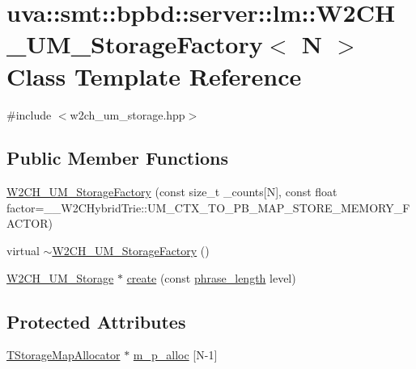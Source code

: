 \hypertarget{classuva_1_1smt_1_1bpbd_1_1server_1_1lm_1_1_w2_c_h___u_m___storage_factory}{}\section{uva\+:\+:smt\+:\+:bpbd\+:\+:server\+:\+:lm\+:\+:W2\+C\+H\+\_\+\+U\+M\+\_\+\+Storage\+Factory$<$ N $>$ Class Template Reference}
\label{classuva_1_1smt_1_1bpbd_1_1server_1_1lm_1_1_w2_c_h___u_m___storage_factory}


{\ttfamily \#include $<$w2ch\+\_\+um\+\_\+storage.\+hpp$>$}

\subsection*{Public Member Functions}
\begin{DoxyCompactItemize}
\item 
\hyperlink{classuva_1_1smt_1_1bpbd_1_1server_1_1lm_1_1_w2_c_h___u_m___storage_factory_aa6ecf82dcaf503dd92af8763cb90b093}{W2\+C\+H\+\_\+\+U\+M\+\_\+\+Storage\+Factory} (const size\+\_\+t \+\_\+counts\mbox{[}N\mbox{]}, const float factor=\+\_\+\+\_\+\+W2\+C\+Hybrid\+Trie\+::\+U\+M\+\_\+\+C\+T\+X\+\_\+\+T\+O\+\_\+\+P\+B\+\_\+\+M\+A\+P\+\_\+\+S\+T\+O\+R\+E\+\_\+\+M\+E\+M\+O\+R\+Y\+\_\+\+F\+A\+C\+T\+O\+R)
\item 
virtual \hyperlink{classuva_1_1smt_1_1bpbd_1_1server_1_1lm_1_1_w2_c_h___u_m___storage_factory_ad3fa9bea0072bda045c90512c5ae8d7a}{$\sim$\+W2\+C\+H\+\_\+\+U\+M\+\_\+\+Storage\+Factory} ()
\item 
\hyperlink{classuva_1_1smt_1_1bpbd_1_1server_1_1lm_1_1_w2_c_h___u_m___storage}{W2\+C\+H\+\_\+\+U\+M\+\_\+\+Storage} $\ast$ \hyperlink{classuva_1_1smt_1_1bpbd_1_1server_1_1lm_1_1_w2_c_h___u_m___storage_factory_ab360ad98835a2d1f4ec6fb91ad35bb83}{create} (const \hyperlink{namespaceuva_1_1smt_1_1bpbd_1_1server_af068a19c2e03116caf3e3827a3e40e35}{phrase\+\_\+length} level)
\end{DoxyCompactItemize}
\subsection*{Protected Attributes}
\begin{DoxyCompactItemize}
\item 
\hyperlink{namespaceuva_1_1smt_1_1bpbd_1_1server_1_1lm_a70b67dc80579cc0df5e9509d40b2563a}{T\+Storage\+Map\+Allocator} $\ast$ \hyperlink{classuva_1_1smt_1_1bpbd_1_1server_1_1lm_1_1_w2_c_h___u_m___storage_factory_a2191bc31eb8246da200e8c39a353c0f8}{m\+\_\+p\+\_\+alloc} \mbox{[}N-\/1\mbox{]}
\end{DoxyCompactItemize}



